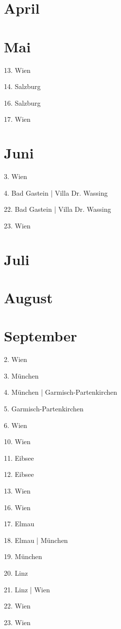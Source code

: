 \documentclass[twoside=false,titlepage=false,open=any, parskip=never, fontsize=10pt, headings=small, chapterprefix=false, appendixprefix=false, DIV=15]{scrbook}
\begin{document}
\begin{multicols}{3}
            \section*{April}
            \section*{Mai}
            13. Wien\par
            14. Salzburg\par
            16. Salzburg\par
            17. Wien\par
            \section*{Juni}
            3. Wien\par
            4. Bad Gastein | Villa Dr. Wassing\par
            22. Bad Gastein | Villa Dr. Wassing\par
            23. Wien\par
            \section*{Juli}
            \section*{August}
            \section*{September}
            2. Wien\par
            3. München\par
            4. München | Garmisch-Partenkirchen\par
            5. Garmisch-Partenkirchen\par
            6. Wien\par
            10. Wien\par
            11. Eibsee\par
            12. Eibsee\par
            13. Wien\par
            16. Wien\par
            17. Elmau\par
            18. Elmau | München\par
            19. München\par
            20. Linz\par
            21. Linz | Wien\par
            22. Wien\par
            23. Wien\par

\end{multicols}
\end{document}
